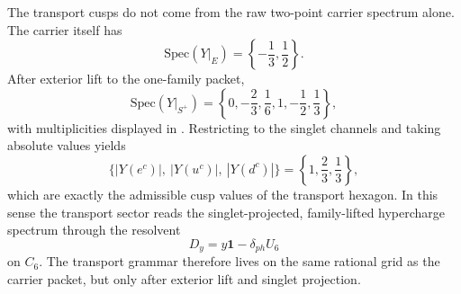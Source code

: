 \begin{remark}
The transport cusps do not come from the raw two-point carrier spectrum alone. The carrier itself has
\[
\mathrm{Spec}(Y|_E)=\left\{-\frac13,\frac12\right\}.
\]
After exterior lift to the one-family packet,
\[
\mathrm{Spec}(Y|_{S^+})
=
\left\{0,-\frac23,\frac16,1,-\frac12,\frac13\right\},
\]
with multiplicities displayed in . Restricting to the singlet channels and taking absolute values yields
\[
\{|Y(e^c)|,\ |Y(u^c)|,\ |Y(d^c)|\}
=
\left\{1,\frac23,\frac13\right\},
\]
which are exactly the admissible cusp values of the transport hexagon. In this sense the transport sector reads the singlet-projected, family-lifted hypercharge spectrum through the resolvent
\[
D_y=y\mathbf 1-\delta_{ph}U_6
\]
on $C_6$. The transport grammar therefore lives on the same rational grid as the carrier packet, but only after exterior lift and singlet projection.
\end{remark}
